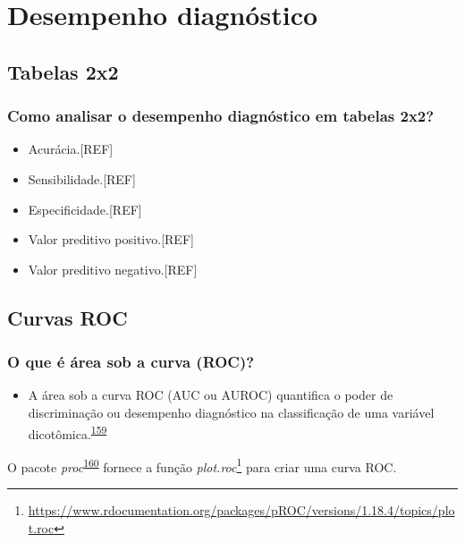 \documentclass[
  a4paper,
]{book}
\providecommand{\tightlist}{%
  \setlength{\itemsep}{0pt}\setlength{\parskip}{0pt}}
\renewcommand{\href}[2]{#2\footnote{\url{#1}}}
\newenvironment{infobox}[1]
  {
  \begin{itemize}
  \renewcommand{\labelitemi}{
    \raisebox{-.7\height}[0pt][0pt]{
      {\setkeys{Gin}{width=3em,keepaspectratio}
        \texttt{[image: \#1]}}
    }
  }
  \setlength{\fboxsep}{1em}
  \begin{blackbox}
  \item
  }
  {
  \end{blackbox}
  \end{itemize}
  }
\begin{document}
\hypertarget{analise-desempenho-diagnostico}{%
\chapter{\texorpdfstring{\textbf{Desempenho diagnóstico}}{Desempenho diagnóstico}}\label{analise-desempenho-diagnostico}}

\hypertarget{tabelas-2x2}{%
\section{Tabelas 2x2}\label{tabelas-2x2}}

\hypertarget{como-analisar-o-desempenho-diagnuxf3stico-em-tabelas-2x2}{%
\subsection{Como analisar o desempenho diagnóstico em tabelas 2x2?}\label{como-analisar-o-desempenho-diagnuxf3stico-em-tabelas-2x2}}

\begin{itemize}
\item
  Acurácia.{[}REF{]}
\item
  Sensibilidade.{[}REF{]}
\item
  Especificidade.{[}REF{]}
\item
  Valor preditivo positivo.{[}REF{]}
\item
  Valor preditivo negativo.{[}REF{]}
\end{itemize}

\hypertarget{curvas-roc}{%
\section{Curvas ROC}\label{curvas-roc}}

\hypertarget{o-que-uxe9-uxe1rea-sob-a-curva-roc}{%
\subsection{O que é área sob a curva (ROC)?}\label{o-que-uxe9-uxe1rea-sob-a-curva-roc}}

\begin{itemize}
\tightlist
\item
  A área sob a curva ROC (AUC ou AUROC) quantifica o poder de discriminação ou desempenho diagnóstico na classificação de uma variável dicotômica.\textsuperscript{\protect\hyperlink{ref-de2022}{159}}
\end{itemize}

\begin{infobox}{images/Rlogo}
O pacote \emph{proc}\textsuperscript{\protect\hyperlink{ref-pROC}{160}} fornece a função \href{https://www.rdocumentation.org/packages/pROC/versions/1.18.4/topics/plot.roc}{\emph{plot.roc}} para criar uma curva ROC.

\end{infobox}
\end{document}
